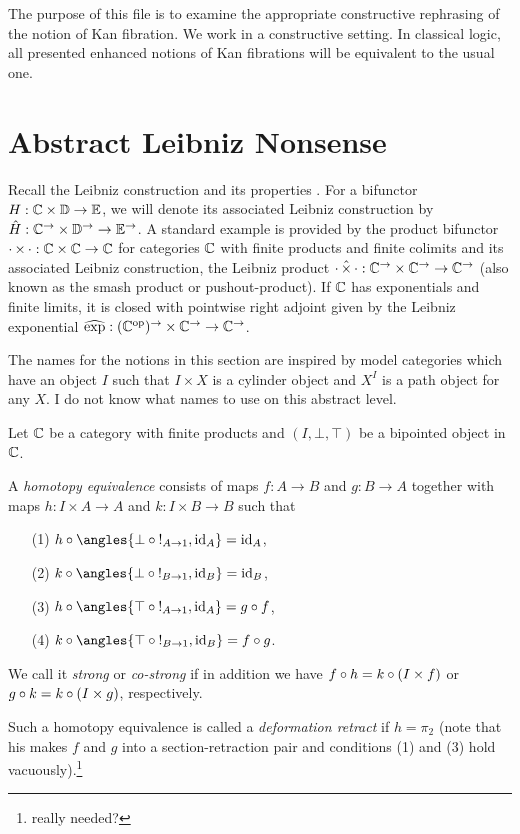 \documentclass[reqno,10pt,a4paper,oneside]{amsart}
\begin{document}
The purpose of this file is to examine the appropriate constructive rephrasing of the notion of Kan fibration.
We work in a constructive setting.
In classical logic, all presented enhanced notions of Kan fibrations will be equivalent to the usual one. 

\section{Abstract Leibniz Nonsense}

Recall the Leibniz construction and its properties \cite[Section 4]{riehl-verity:reedy}.
For a bifunctor $H : \mathbb{C} \times \mathbb{D} \to \mathbb{E}$, we will denote its associated Leibniz construction by $\hat{H} : \mathbb{C}^{\to} \times \mathbb{D}^{\to} \to \mathbb{E}^{\to}$.
A standard example is provided by the product bifunctor $\mathop{\cdot} \times \mathop{\cdot} : \mathbb{C} \times \mathbb{C} \to \mathbb{C}$ for categories $\mathbb{C}$ with finite products and finite colimits and its associated Leibniz construction, the Leibniz product $\mathop{\cdot} \mathbin{\hat{\times}} \mathop{\cdot} : \mathbb{C}^{\to} \times \mathbb{C}^{\to} \to \mathbb{C}^{\to}$ (also known as the smash product or pushout-product).
If $\mathbb{C}$ has exponentials and finite limits, it is closed with pointwise right adjoint given by the Leibniz exponential $\operatorname{\widehat{exp}} : (\mathbb{C}^{\mathrm{op}})^{\to} \times \mathbb{C}^{\to} \to \mathbb{C}^{\to}$.

The names for the notions in this section are inspired by model categories which have an object $I$ such that $I \times X$ is a cylinder object and $X^I$ is a path object for any $X$.
I do not know what names to use on this abstract level.

Let $\mathbb{C}$ be a category with finite products and $(I, \bot, \top)$ be a bipointed object in $\mathbb{C}$.

\begin{definition}
\label{def:homotopy-equivalence}
A \emph{homotopy equivalence} consists of maps $f : A \to B$ and $g : B \to A$ together with maps $h : I \times A \to A$ and $k : I \times B \to B$ such that
\begin{itemize}
\item[(1)] $h \cc \angles{\bot \cc \canonical_{A \to 1}, \id_A} = \id_A$,
\item[(2)] $k \cc \angles{\bot \cc \canonical_{B \to 1}, \id_B} = \id_B$,
\item[(3)] $h \cc \angles{\top \cc \canonical_{A \to 1}, \id_A} = g \cc f$,
\item[(4)] $k \cc \angles{\top \cc \canonical_{B \to 1}, \id_B} = f \cc g$.
\end{itemize}
We call it \emph{strong} or \emph{co-strong} if in addition we have $f \mathbin{\circ} h = k \mathbin{\circ} (I \times f)$ or $g \mathbin{\circ} k = k \mathbin{\circ} (I \times g)$, respectively.

Such a homotopy equivalence is called a \emph{deformation retract} if $h = \pi_2$ (note that his makes $f$ and $g$ into a section-retraction pair and conditions (1) and (3) hold vacuously).\footnote{really needed?}
\end{definition}
\end{document}
